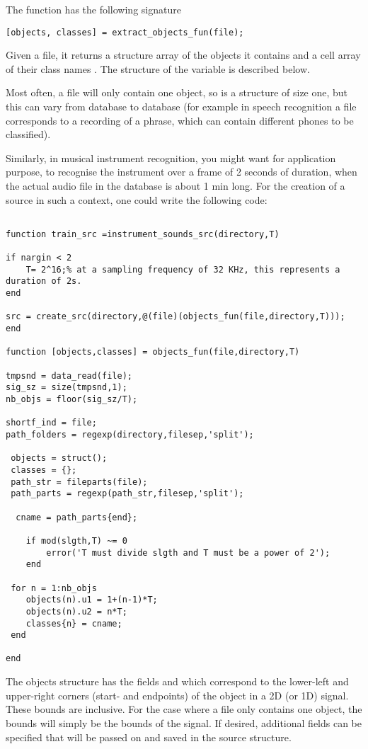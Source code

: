 \documentclass{article}
\begin{document}
The  function has the following signature
\begin{lstlisting}
[objects, classes] = extract_objects_fun(file);
\end{lstlisting}
Given a file, it returns a structure array  of the objects it contains and a cell array of their class names . The structure of the  variable is described below.

Most often, a file will only contain one object, so  is a  structure of size one, but this can vary from database to database (for example in speech recognition a file corresponds to a recording of a phrase, which can contain different phones to be classified).

Similarly, in musical instrument recognition, you might want for application purpose, to recognise the instrument over a
frame of 2 seconds of duration, when the actual audio file in the database is about 1 min long.  For the creation
of a source in such a context, one could write the following code:

\begin{lstlisting}

function train_src =instrument_sounds_src(directory,T)

if nargin < 2
    T= 2^16;% at a sampling frequency of 32 KHz, this represents a duration of 2s. 
end

src = create_src(directory,@(file)(objects_fun(file,directory,T)));
end

function [objects,classes] = objects_fun(file,directory,T)

tmpsnd = data_read(file);
sig_sz = size(tmpsnd,1);
nb_objs = floor(sig_sz/T);

shortf_ind = file;
path_folders = regexp(directory,filesep,'split');

 objects = struct();
 classes = {};
 path_str = fileparts(file);
 path_parts = regexp(path_str,filesep,'split');
    
  cname = path_parts{end};
   
    if mod(slgth,T) ~= 0
        error('T must divide slgth and T must be a power of 2');
    end
     
 for n = 1:nb_objs
    objects(n).u1 = 1+(n-1)*T;
    objects(n).u2 = n*T;
    classes{n} = cname;
 end

end

\end{lstlisting}

The objects structure has the fields  and  which correspond to the lower-left and upper-right corners (start- and endpoints) of the object in a 2D (or 1D) signal. These bounds are inclusive. For the case where a file only contains one object, the bounds will simply be the bounds of the signal. If desired, additional fields can be specified that will be passed on and saved in the source structure.
\end{document}
